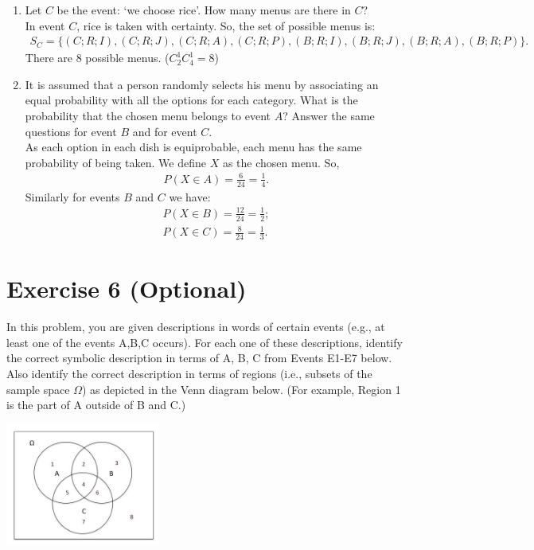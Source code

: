 \documentclass[12pt,thmsa]{article}\usepackage[]{graphicx}\usepackage[]{color}
\begin{document}
\begin{enumerate}
\item Let $C$ be the event: `we choose rice'. How many menus are there in $C$?\\
 In event $C$, rice is taken with certainty. So, the set of possible menus is:
\begin{align*}
S_C = \{  (C;R;I),(C;R;J),(C;R;A),(C;R;P), (B;R;I),(B;R;J),(B;R;A),(B;R;P) \}.
\end{align*}
There are 8 possible menus. ($C^{1}_{2}C^{1}_{4}=8$)
\medskip

 \item It is assumed that a person randomly selects his menu by associating an equal probability with
all the options for each category. What is the probability that the chosen menu belongs to event $A$?
Answer the same questions for event $B$ and for event $C$.\\
 As each option in each dish is equiprobable, each menu has the same probability of being taken. We define $X$ as the chosen menu. So,
\begin{align*}
P(X \in A) =  \frac{6}{24} = \frac{1}{4}.
\end{align*}
Similarly for events $B$ and $C$ we have:
\begin{align*}
P(X \in B) = \frac{12} {24} = \frac{1}{2}; \\
P(X \in C) = \frac{8}{24} = \frac{1}{3}.
\end{align*}

\end{enumerate}

\newpage

\section*{Exercise 6 (Optional)}
In this problem, you are given descriptions in words of certain events (e.g., at least one of the events A,B,C occurs). For each one of these descriptions, identify the correct symbolic description in terms of A, B, C from Events E1-E7 below. Also identify the correct description in terms of regions (i.e., subsets of the sample space $\Omega$) as depicted in the Venn diagram below. (For example, Region 1 is the part of A outside of B and C.)
\begin{center}
\includegraphics[width = 2in]{images1.jpg}
\end{center}
\end{document}
